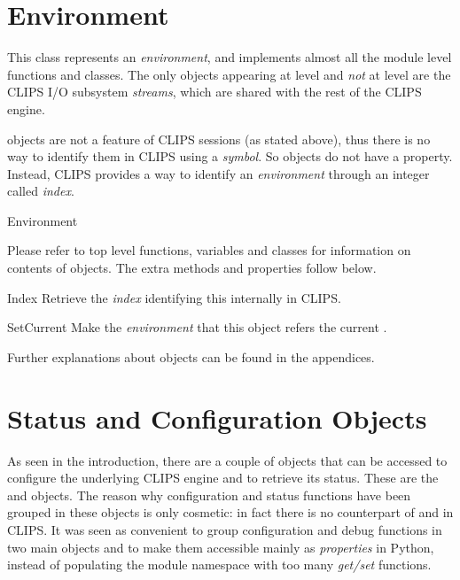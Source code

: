 \section{Environment\label{pyclips-cl-Environment}}

This class represents an \emph{environment}, and implements almost all
the module level functions and classes. The only objects appearing at
\pyclips{} level and \emph{not} at  level are the
CLIPS I/O subsystem \emph{streams}, which are shared with the rest of
the CLIPS engine.

 objects are not a feature of CLIPS sessions (as
stated above), thus there is no way to identify them in CLIPS using
a \emph{symbol}. So  objects do not have a 
property. Instead, CLIPS provides a way to identify an
\emph{environment} through an integer called \emph{index}.

\begin{classdesc*}{Environment}

Please refer to top level functions, variables and classes for
information on contents of  objects. The extra
methods and properties follow below.

\begin{memberdesc}[property]{Index}
Retrieve the \emph{index} identifying this 
internally in CLIPS.
\end{memberdesc}

\begin{methoddesc}{SetCurrent}{}
Make the \emph{environment} that this object refers the current
.
\end{methoddesc}

Further explanations about  objects can be found
in the appendices.

\end{classdesc*}



\section{Status and Configuration Objects\label{pyclips-cl-statusconf}}

As seen in the introduction, there are a couple of objects that can be
accessed to configure the underlying CLIPS engine and to retrieve its
status. These are the  and  objects.
The reason why configuration and status functions have been grouped in
these objects is only cosmetic: in fact there is no counterpart of
 and  in CLIPS. It was seen as convenient
to group configuration and debug functions in two main objects and to
make them accessible mainly as \emph{properties} in Python, instead of
populating the module namespace with too many \emph{get/set} functions.

